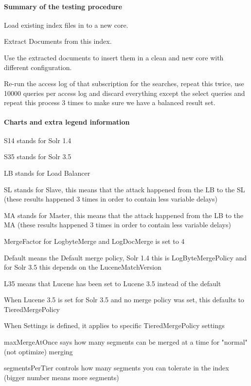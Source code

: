 \paragraph{Summary of the testing procedure}
\begin{packed_enumerate}
\item Load existing index files in to a new core.
\item Extract Documents from this index.
\item Use the extracted documents to insert them in a clean and new core with different configuration.
\item Re-run the access log of that subscription for the searches, repeat this twice, use 10000 queries per access log and discard everything except the select queries and repeat this process 3 times to make sure we have a balanced result set.
\end{packed_enumerate}

\paragraph{Charts and extra legend information}
\begin{packed_itemize}
\item S14 stands for Solr 1.4
\item S35 stands for Solr 3.5
\item LB stands for Load Balancer
\item SL stands for Slave, this means that the attack happened from the LB to the SL (these results happened 3 times in order to contain less variable delays)
\item MA stands for Master, this means that the attack happened from the LB to the MA (these results happened 3 times in order to contain less variable delays)
\item MergeFactor for LogbyteMerge and LogDocMerge is set to 4
\item Default means the Default merge policy, Solr 1.4 this is LogByteMergePolicy and for Solr 3.5 this depends on the LuceneMatchVersion
\item L35 means that Lucene has been set to Lucene 3.5 instead of the default
\item When Lucene 3.5 is set for Solr 3.5 and no merge policy was set, this defaults to TieredMergePolicy
\item When Settings is defined, it applies to specific TieredMergePolicy settings
\begin{packed_enumerate}
\item maxMergeAtOnce says how many segments can be merged at a time for "normal" (not optimize) merging
\item segmentsPerTier controls how many segments you can tolerate in the index (bigger number means more segments)
\end{packed_enumerate}
\end{packed_itemize}

